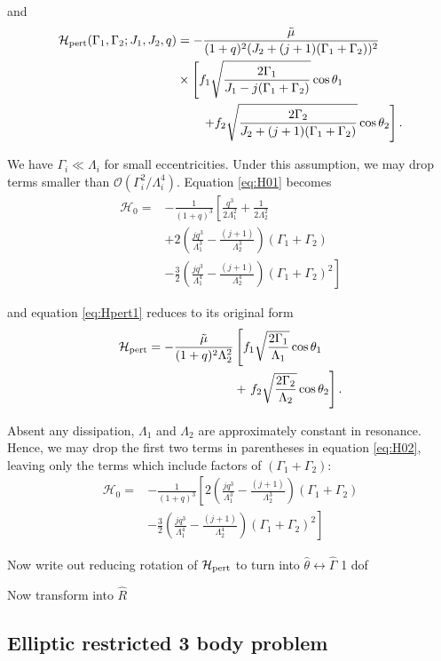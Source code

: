 \documentclass[usenatbib]{mnras}
\newcommand{\note}[1]{{\color{red} \large #1 }}
\begin{document}
\noindent
and
\begin{align}
  \label{eq:Hpert1}
  \mathcal{H}_{\rm pert}(\Gamma_1,\Gamma_2; J_1, J_2, q)
  &= -\frac{\tilde\mu}{(1+q)^2(J_2+(j+1)(\Gamma_1+\Gamma_2))^2}\nonumber\\
  &\times\left[
    f_1\sqrt{\frac{2\Gamma_1}{J_1 - j(\Gamma_1+\Gamma_2)}}\cos\theta_1\right.\nonumber\\
  &\quad\quad\left.+f_2\sqrt{\frac{2\Gamma_2}{J_2 + (j+1)(\Gamma_1+\Gamma_2)}}\cos\theta_2
    \right].
\end{align}

\noindent We have \(\Gamma_i \ll \Lambda_i\) for small
eccentricities.  Under this assumption, we may drop terms smaller than
\(\mathcal{O}(\Gamma_i^2/\Lambda_i^4)\).  Equation \eqref{eq:H01} becomes
\begin{align}
  \label{eq:H02}
  \mathcal{H}_0
  =& -\frac{1}{(1+q)^3}\left[
     \frac{q^3}{2\Lambda_1^2} + \frac{1}{2\Lambda_2^2}\right. \nonumber\\
   &+ 2\left(
     \frac{jq^3}{\Lambda_1^3} - \frac{(j+1)}{\Lambda_2^3}
     \right)(\Gamma_1+\Gamma_2)\nonumber\\
   &-\frac32\left.\left( 
     \frac{jq^3}{\Lambda_1^4} - \frac{(j+1)}{\Lambda_2^4}\right)
     (\Gamma_1+\Gamma_2)^2
     \right]
\end{align}

\noindent
and equation \eqref{eq:Hpert1} reduces to its original form
\begin{align}
\label{eq:H_3}
  \mathcal{H}_{\rm pert}
  =-\frac{\tilde\mu}{(1+q)^2\Lambda_2^2}
    &\left[
    f_1\sqrt{\frac{2\Gamma_1}{\Lambda_1}}\cos\theta_1\right.\nonumber\\
  &+\left.f_2\sqrt{\frac{2\Gamma_2}{\Lambda_2}}\cos\theta_2
    \right].
\end{align}

\noindent Absent any dissipation, \(\Lambda_1\) and
\(\Lambda_2\) are approximately constant in resonance.  Hence, we may
drop the first two terms in parentheses in equation \eqref{eq:H02},
leaving only the terms which include factors of \((\Gamma_1+\Gamma_2)\):
\begin{align}
  \label{eq:H03}
  \mathcal{H}_0
  =& -\frac{1}{(1+q)^3}\left[
   2\left(
     \frac{jq^3}{\Lambda_1^3} - \frac{(j+1)}{\Lambda_2^3}
     \right)(\Gamma_1+\Gamma_2)\nonumber\\
   &-\frac32\left.\left( 
     \frac{jq^3}{\Lambda_1^4} - \frac{(j+1)}{\Lambda_2^4}\right)
     (\Gamma_1+\Gamma_2)^2
     \right]
\end{align}

\note{
Now write out reducing rotation of $\mathcal H_{\rm pert}$
to turn into $\hat\theta\longleftrightarrow\hat\Gamma$ 1 dof
}

\note{
Now transform into $\hat R$
}


\subsection{Elliptic restricted 3 body problem}
\label{sec:org23ac44d}



\end{document}
